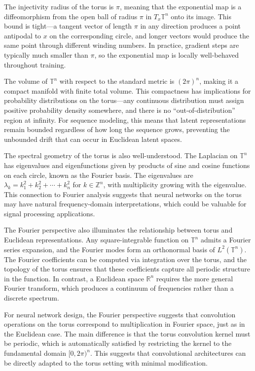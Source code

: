 \documentclass[12pt,letterpaper,twoside]{article}
\newcommand{\R}{\mathbb{R}}
\newcommand{\T}{\mathbb{T}}
\newcommand{\Z}{\mathbb{Z}}
\begin{document}
The injectivity radius of the torus is $\pi$, meaning that the exponential map is a diffeomorphism from the open ball of radius $\pi$ in $T_x\T^n$ onto its image. This bound is tight—a tangent vector of length $\pi$ in any direction produces a point antipodal to $x$ on the corresponding circle, and longer vectors would produce the same point through different winding numbers. In practice, gradient steps are typically much smaller than $\pi$, so the exponential map is locally well-behaved throughout training.

The volume of $\T^n$ with respect to the standard metric is $(2\pi)^n$, making it a compact manifold with finite total volume. This compactness has implications for probability distributions on the torus—any continuous distribution must assign positive probability density somewhere, and there is no ``out-of-distribution'' region at infinity. For sequence modeling, this means that latent representations remain bounded regardless of how long the sequence grows, preventing the unbounded drift that can occur in Euclidean latent spaces.

The spectral geometry of the torus is also well-understood. The Laplacian on $\T^n$ has eigenvalues and eigenfunctions given by products of sine and cosine functions on each circle, known as the Fourier basis. The eigenvalues are $\lambda_k = k_1^2 + k_2^2 + \cdots + k_n^2$ for $k \in \Z^n$, with multiplicity growing with the eigenvalue. This connection to Fourier analysis suggests that neural networks on the torus may have natural frequency-domain interpretations, which could be valuable for signal processing applications.

The Fourier perspective also illuminates the relationship between torus and Euclidean representations. Any square-integrable function on $\T^n$ admits a Fourier series expansion, and the Fourier modes form an orthonormal basis of $L^2(\T^n)$. The Fourier coefficients can be computed via integration over the torus, and the topology of the torus ensures that these coefficients capture all periodic structure in the function. In contrast, a Euclidean space $\R^n$ requires the more general Fourier transform, which produces a continuum of frequencies rather than a discrete spectrum.

For neural network design, the Fourier perspective suggests that convolution operations on the torus correspond to multiplication in Fourier space, just as in the Euclidean case. The main difference is that the torus convolution kernel must be periodic, which is automatically satisfied by restricting the kernel to the fundamental domain $[0, 2\pi)^n$. This suggests that convolutional architectures can be directly adapted to the torus setting with minimal modification.
\end{document}
